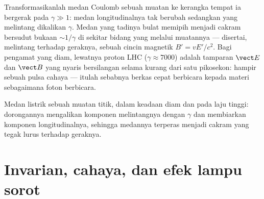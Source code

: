 \begin{example}\label{ex:b3:covariant-electromagnetism:pancake}
Transformasikanlah medan Coulomb sebuah muatan ke kerangka tempat ia
bergerak pada $\gamma \gg 1$: medan longitudinalnya tak berubah
sedangkan yang melintang dikalikan $\gamma$. Medan yang tadinya bulat
memipih menjadi cakram bersudut bukaan $\sim 1/\gamma$ di sekitar bidang
yang melalui muatannya --- disertai, melintang terhadap geraknya, sebuah
cincin magnetik $B' = vE'/c^2$. Bagi pengamat yang diam, lewatnya proton
LHC ($\gamma \approx 7000$) adalah tamparan $\vect E$ dan $\vect B$
yang nyaris bersilangan selama kurang dari satu pikosekon: hampir sebuah
pulsa cahaya --- itulah sebabnya berkas cepat berbicara kepada materi
sebagaimana foton berbicara.
\end{example}

\begin{omfigure}

{\small Medan listrik sebuah muatan titik, dalam keadaan diam dan pada
laju tinggi: dorongannya mengalikan komponen melintangnya dengan
$\gamma$ dan membiarkan komponen longitudinalnya, sehingga medannya
terperas menjadi cakram yang tegak lurus terhadap geraknya.}
\end{omfigure}

\section{Invarian, cahaya, dan efek lampu sorot}

